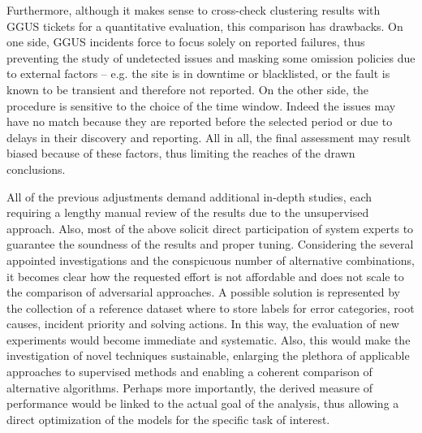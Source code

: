 Furthermore, although it makes sense to cross-check clustering results with GGUS tickets for a quantitative evaluation, this comparison has drawbacks. 
On one side, GGUS incidents force to focus solely on reported failures, thus preventing the study of undetected issues and masking some omission policies due to external factors -- e.g. the site is in downtime or blacklisted, or the fault is known to be transient and therefore not reported.
On the other side, the procedure is sensitive to the choice of the time window.
Indeed the issues may have no match because they are reported before the selected period or due to delays in their discovery and reporting. 
All in all, the final assessment may result biased because of these factors, thus limiting the reaches of the drawn conclusions.

All of the previous adjustments demand additional in-depth studies, each requiring a lengthy manual review of the results due to the unsupervised approach.
Also, most of the above solicit direct participation of system experts to guarantee the soundness of the results and proper tuning.
Considering the several appointed investigations and the conspicuous number of alternative combinations, it becomes clear how the requested effort is not affordable and does not scale to the comparison of adversarial approaches.
A possible solution is represented by the collection of a reference dataset where to store labels for error categories, root causes, incident priority and solving actions. 
In this way, the evaluation of new experiments would become immediate and systematic.
Also, this would make the investigation of novel techniques sustainable, enlarging the plethora of applicable approaches to supervised methods and enabling a coherent comparison of alternative algorithms.
Perhaps more importantly, the derived measure of performance would be linked to the actual goal of the analysis, thus allowing a direct optimization of the models for the specific task of interest.




